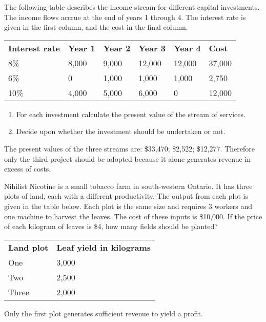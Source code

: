 \begin{enumialphparenastyle}
\begin{ex}\label{ex:ch12ex6}
The following table describes the income stream for different capital investments. The income flows accrue at the end of years 1 through 4. The interest rate is given in the first column, and the cost in the final column.
\begin{center}
\begin{tabu} to \linewidth {|X[1,c]X[1,c]X[1,c]X[1,c]X[1,c]X[1,c]|}	\hline
{}	\textbf{Interest rate}	&	\textbf{Year 1}	&	\textbf{Year 2}	&	\textbf{Year 3}	&	\textbf{Year 4}	&	\textbf{Cost}	\\[0.25em]
8\%		&	8,000	&	9,000	&	12,000	&	12,000	&	37,000	\\
	6\%		&	0	&	1,000	&	1,000	&	1,000	&	2,750	\\
10\%	&	4,000	&	5,000	&	6,000	&	0		&	12,000	\\	\hline
\end{tabu}
\end{center}
\begin{enumerate}
	\item	For each investment calculate the present value of the stream of services.
	\item	Decide upon whether the investment should be undertaken or not.
\end{enumerate}
\begin{sol}
	The present values of the three streams are: \$33,470; \$2,522; \$12,277. Therefore only the third project should be adopted because it alone generates revenue in excess of costs.
	
\end{sol}
\end{ex}

\begin{ex}\label{ex:ch12ex7}
Nihilist Nicotine is a small tobacco farm in south-western Ontario. It has three plots of land, each with a different productivity. The output from each plot is given in the table below. Each plot is the same size and requires 3 workers and one machine to harvest the leaves. The cost of these inputs is \$10,000. If the price of each kilogram of leaves is \$4, how many fields should be planted?
\begin{center}
\begin{tabu} to 25em {|X[1,c]X[1,c]|}	\hline
{}	\textbf{Land plot}	&	\textbf{Leaf yield in kilograms}	\\
						One					&	3,000								\\
	Two					&	2,500								\\
						Three				&	2,000								\\	\hline
\end{tabu}
\end{center}
\begin{sol}
	Only the first plot generates sufficient revenue to yield a profit.
	

\end{sol}
\end{ex}
\end{enumialphparenastyle}
